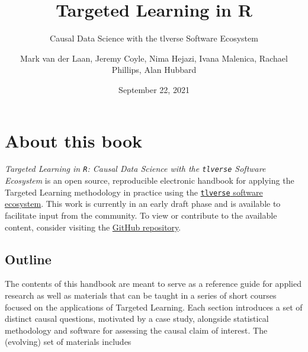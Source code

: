 \documentclass[
  12pt, krantz2,
]{krantz}
\title{Targeted Learning in R}
\subtitle{Causal Data Science with the tlverse Software Ecosystem}
\author{Mark van der Laan, Jeremy Coyle, Nima Hejazi, Ivana Malenica, Rachael Phillips, Alan Hubbard}
\date{September 22, 2021}
\newcommand{\passthrough}[1]{#1}
\theoremstyle{definition}
\theoremstyle{definition}
\theoremstyle{definition}
\newcommand{\1}{\mathbbm{1}}
\begin{document}
\maketitle


\thispagestyle{empty}

\begin{center}
\end{center}

\setlength{\abovedisplayskip}{-5pt}
\setlength{\abovedisplayshortskip}{-5pt}

\mainmatter

{
\hypersetup{linkcolor=}
\setcounter{tocdepth}{2}
\tableofcontents
}
\listoftables
\listoffigures
\hypertarget{about-this-book}{%
\chapter*{About this book}\label{about-this-book}}


\emph{Targeted Learning in \passthrough{\lstinline!R!}: Causal Data Science with the \passthrough{\lstinline!tlverse!} Software
Ecosystem} is an open source, reproducible electronic handbook for applying the
Targeted Learning methodology in practice using the \href{https://github.com/tlverse}{\passthrough{\lstinline!tlverse!} software
ecosystem}. This work is currently in an early draft
phase and is available to facilitate input from the community. To view or
contribute to the available content, consider visiting the \href{https://github.com/tlverse/tlverse-handbook}{GitHub
repository}.

\hypertarget{outline}{%
\section{Outline}\label{outline}}

The contents of this handbook are meant to serve as a reference guide for
applied research as well as materials that can be taught in a series of short
courses focused on the applications of Targeted Learning. Each section
introduces a set of distinct causal questions, motivated by a case study,
alongside statistical methodology and software for assessing the causal claim of
interest. The (evolving) set of materials includes
\end{document}
